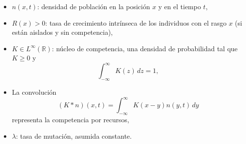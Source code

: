 {    \begin{itemize}
     \item \( n(x,t) \): densidad de población en la posición \( x \) y en el tiempo \( t \),
     \item \( R(x) > 0 \): tasa de crecimiento intrínseca de los individuos con el rasgo \( x \) (si están aislados y sin competencia),
     \item \( K \in L^\infty(\mathbb{R}) \): núcleo de competencia, una densidad de probabilidad tal que \( K \geq 0 \) y 
     \[
        \int_{-\infty}^{\infty} K(z) \, dz = 1,
     \]
     \item La convolución 
     \[
     (K * n)(x,t) = \int_{-\infty}^{\infty} K(x - y) n(y,t) \, dy
     \]
     representa la competencia por recursos,
     \item \( \lambda \): tasa de mutación, asumida constante.
    \end{itemize}

}
